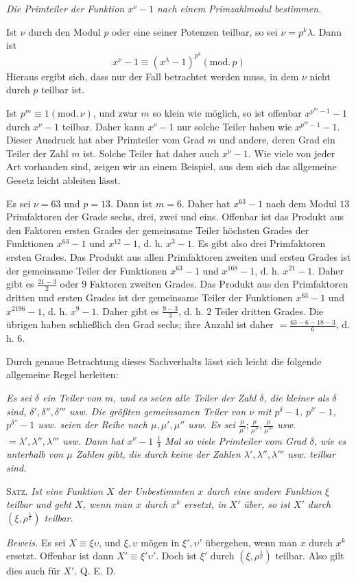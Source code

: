 \par\medskip{}
\begin{center}\emph{Die Primteiler der Funktion $x^\nu-1$ nach einem Primzahlmodul bestimmen.}\end{center}
Ist $\nu$ durch den Modul $p$ oder eine seiner Potenzen teilbar, so sei $\nu=p^k\lambda$. Dann ist
\[
x^\nu-1\equiv(x^\lambda-1)^{p^k}(\mathrm{mod.}\,p)
\]
Hieraus ergibt sich, dass nur der Fall betrachtet werden muss, in dem $\nu$ nicht durch $p$ teilbar ist.

Ist $p^m\equiv1(\mathrm{mod.}\,\nu)$, und zwar $m$ so klein wie möglich, so ist offenbar $x^{p^m-1}-1$ durch $x^\nu-1$ teilbar. Daher kann $x^\nu-1$ nur solche Teiler haben wie $x^{p^m-1}-1$. Dieser Ausdruck hat aber Primteiler vom Grad $m$ und andere, deren Grad ein Teiler der Zahl $m$ ist. Solche Teiler hat daher auch $x^\nu-1$. Wie viele von jeder Art vorhanden sind, zeigen wir an einem Beispiel, aus dem sich das allgemeine Gesetz leicht ableiten lässt.

Es sei $\nu=63$ und $p=13$. Dann ist $m=6$. Daher hat $x^{63}-1$ nach dem Modul $13$ Primfaktoren der Grade sechs, drei, zwei und eins. Offenbar ist das Produkt aus den Faktoren ersten Grades der gemeinsame Teiler höchsten Grades der Funktionen $x^{63}-1$ und $x^{12}-1$, d. h. $x^3-1$. Es gibt also drei Primfaktoren ersten Grades. Das Produkt aus allen Primfaktoren zweiten und ersten Grades ist der gemeinsame Teiler der Funktionen $x^{63}-1$ und $x^{168}-1$, d. h. $x^{21}-1$. Daher gibt es $\frac{21-3}2$ oder $9$ Faktoren zweiten Grades. Das Produkt aus den Primfaktoren dritten und ersten Grades ist der gemeinsame Teiler der Funktionen $x^{63}-1$ und $x^{2196}-1$, d. h. $x^9-1$. Daher gibt es $\frac{9-3}3$, d. h. $2$ Teiler dritten Grades. Die übrigen haben schließlich den Grad sechs; ihre Anzahl ist daher $=\frac{63-6-18-3}6$, d. h. $6$.

Durch genaue Betrachtung dieses Sachverhalts lässt sich leicht die folgende allgemeine Regel herleiten:

\emph{Es sei $\delta$ ein Teiler von $m$, und es seien alle Teiler der Zahl $\delta$, die kleiner als $\delta$ sind, $\delta',\delta'',\delta'''$ usw. Die größten gemeinsamen Teiler von $\nu$ mit $p^\delta-1$, $p^{\delta'}-1$, $p^{\delta''}-1$ usw. seien der Reihe nach $\mu,\mu',\mu''$ usw. Es sei $\frac\mu{\mu'};\frac\mu{\mu''},\frac\mu{\mu'''}$ usw. $=\lambda',\lambda'',\lambda'''$ usw. Dann hat $x^\nu-1$ $\frac1\delta$ Mal so viele Primteiler vom Grad $\delta$, wie es unterhalb von $\mu$ Zahlen gibt, die durch keine der Zahlen $\lambda',\lambda'',\lambda'''$ usw. teilbar sind.}

\textsc{Satz.} \emph{Ist eine Funktion $X$ der Unbestimmten $x$ durch eine andere Funktion $\xi$ teilbar und geht $X$, wenn man $x$ durch $x^k$ ersetzt, in $X'$ über, so ist $X'$ durch $(\xi,\rho^{\frac1k})$ teilbar.}

\emph{Beweis.} Es sei $X\equiv\xi\upsilon$, und $\xi,\upsilon$ mögen in $\xi',\upsilon'$ übergehen, wenn man $x$ durch $x^k$ ersetzt. Offenbar ist dann $X'\equiv\xi'\upsilon'$. Doch ist $\xi'$ durch $(\xi,\rho^{\frac1k})$ teilbar. Also gilt dies auch für $X'$. Q. E. D.

